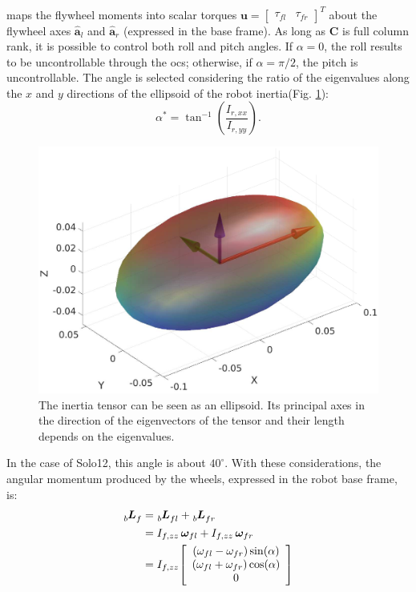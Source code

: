 \documentclass[sensors,article,submit,pdftex,moreauthors]{Definitions/mdpi}
\begin{document}
maps the flywheel moments into scalar torques $\bm{u} = \left[\begin{array}{cc} \tau_{fl} & \tau_{fr} \end{array} \right]^T$ about the flywheel axes $\hat{\bm{a}}_l$ and $\hat{\bm{a}}_r$ (expressed in the base frame).
As long as $\bm{C}$ is full column rank, it is possible to control both roll and pitch angles. If $\alpha = 0$, the roll results to be uncontrollable through the \gls{ocs}; otherwise, if $\alpha = \pi/2$, the pitch is uncontrollable. 
The angle is selected considering the ratio of the eigenvalues along the $x$ and $y$ directions of the ellipsoid of the robot inertia(Fig. \ref{fig:ellipsoid}):
\begin{equation*}
\alpha^{*}=\tan^{-1}\left(\dfrac{I_{r, xx}}{I_{r, yy}}\right).
\end{equation*}
\begin{figure}[t]
	\centering
	\includegraphics[width=1\linewidth]{figures/inertiaEllipsoid.eps}
	\caption{\small The inertia tensor can be seen as an ellipsoid. Its principal axes in the direction of the eigenvectors of the tensor and their length depends on the eigenvalues.}
	\label{fig:ellipsoid}
\end{figure}
In the case of Solo12, this angle is about $40^{\circ}$. With these considerations, the angular momentum produced by the wheels, expressed in the robot base frame, is:
\begin{equation}
\begin{split}
\tensor[_b]{\bm{L}}{_f} &= \tensor[_b]{\bm{L}}{_{fl}} + \tensor[_b]{\bm{L}}{_{fr}} \\
&=I_{f, zz} \, \bm{\omega}_{fl} + I_{f, zz} \, \bm{\omega}_{fr}\\
&=I_{f, zz}
\left[\begin{array}{c}
\left(\omega_{fl} - \omega_{fr}\right)\sin(\alpha) \\ 
\left(\omega_{fl} +  \omega_{fr}\right)\cos(\alpha) \\
0
\end{array}\right]
\end{split}
\label{eq:bLf}
\end{equation}
\end{document}
